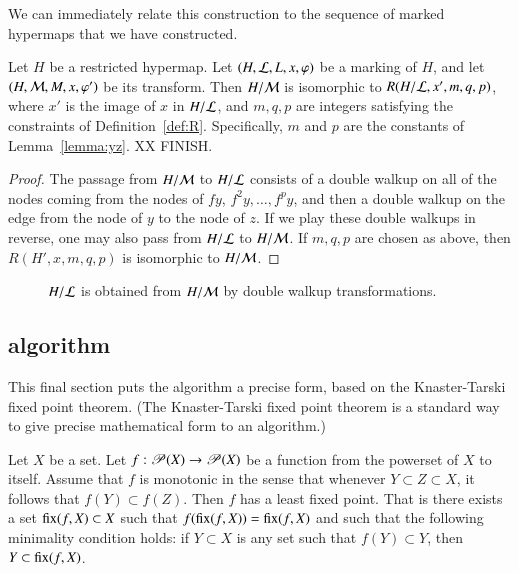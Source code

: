 We can immediately relate this construction to the sequence of marked hypermaps that
we have constructed.

\begin{lemma} Let $H$ be a restricted hypermap.  Let $(H,{\cal L},L,x,\varphi)$ be
a marking of $H$, and let $(H,{\cal M},M,x,\varphi')$ be its transform.
Then $H/{\cal M}$ is isomorphic to $R(H/{\cal L},x',m,q,p)$, where $x'$ is the image
of $x$ in $H/{\cal L}$, and $m,q,p$ are integers satisfying the constraints of Definition~\ref{def:R}.
Specifically, $m$ and $p$ are the constants of Lemma~\ref{lemma:yz}.  XX FINISH.
\end{lemma}

\begin{proof}
The passage from $H/{\cal M}$ to $H/{\cal L}$ consists of a double
walkup on all of the nodes coming from the nodes of $f y$, $f^2 y,
\ldots, f^p y$, and then a double walkup on the edge from the node of
$y$ to the node of
$z$.  %
If we play these double walkups in reverse,
one may also pass from $H/{\cal L}$ to $H/{\cal M}$.  
If
$m,q,p$ are chosen as above, then $R(H',x,m,q,p)$ is isomorphic to
$H/{\cal M}$.  
\end{proof}


\begin{figure}[htb]
\centering
{}
\caption{$H/{\cal L}$ is obtained from $H/{\cal M}$ by double walkup
transformations.}
\label{fig:L1L2dart}
\end{figure}



\subsection{algorithm}

This final section puts the algorithm a precise form, based on
the Knaster-Tarski fixed point theorem.  (The Knaster-Tarski fixed
point theorem is a standard way to give precise mathematical form to
an algorithm.)

\begin{lemma}   
Let $X$ be a set.  Let $f:{\mathscr P}(X)\to {\mathscr P}(X)$ be a
function from the powerset of $X$ to itself.  Assume that $f$ is
monotonic in the sense that whenever $Y\subset Z\subset X$, it
follows that $f(Y) \subset f(Z)$.  Then $f$ has a least fixed point.
That is there exists a set ${\operatorname{fix}}(f,X)\subset X$ such that
$f({\operatorname{fix}}(f,X)) = {\operatorname{fix}}(f,X)$ and such that the following
minimality condition holds: if $Y\subset X$ is any set such that
$f(Y) \subset Y$, then $Y\subset {\operatorname{fix}}(f,X)$.
\end{lemma}
%
%
%
%
%

